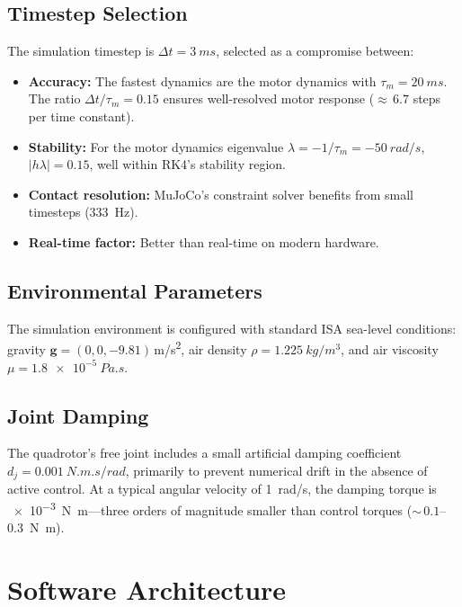 \documentclass[journal]{IEEEtran}
\begin{document}
\subsection{Timestep Selection}

The simulation timestep is $\Delta t = \SI{3}{ms}$, selected as a compromise between:
\begin{itemize}
  \item \textbf{Accuracy:} The fastest dynamics are the motor dynamics with $\tau_m = \SI{20}{ms}$. The ratio $\Delta t / \tau_m = 0.15$ ensures well-resolved motor response (${\approx}\,6.7$ steps per time constant).
  \item \textbf{Stability:} For the motor dynamics eigenvalue $\lambda = -1/\tau_m = \SI{-50}{rad/s}$, $|h\lambda| = 0.15$, well within RK4's stability region.
  \item \textbf{Contact resolution:} MuJoCo's constraint solver benefits from small timesteps (\SI{333}{Hz}).
  \item \textbf{Real-time factor:} Better than real-time on modern hardware.
\end{itemize}

\subsection{Environmental Parameters}

The simulation environment is configured with standard ISA sea-level conditions: gravity $\mathbf{g} = (0, 0, -9.81)$\,\si{m/s^2}, air density $\rho = \SI{1.225}{kg/m^3}$, and air viscosity $\mu = \SI{1.8e-5}{Pa.s}$.

\subsection{Joint Damping}

The quadrotor's free joint includes a small artificial damping coefficient $d_j = \SI{0.001}{N.m.s/rad}$, primarily to prevent numerical drift in the absence of active control. At a typical angular velocity of \SI{1}{rad/s}, the damping torque is \SI{e-3}{N.m}---three orders of magnitude smaller than control torques (${\sim}\,0.1$--\SI{0.3}{N.m}).


\section{Software Architecture}
\label{sec:architecture}
\end{document}
